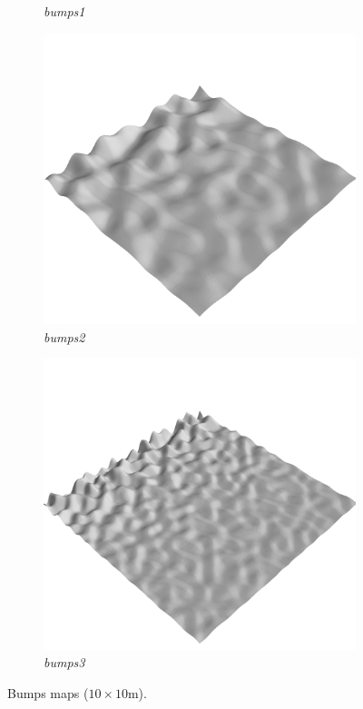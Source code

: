 \documentclass[../document.tex]{subfiles}
\begin{document}
\begin{figure}[H]
\begin{subfigure}[b]{0.32\linewidth}
            \caption{\emph{bumps1}}
            \end{subfigure}    
          \begin{subfigure}[b]{0.32\textwidth}
            \includegraphics[width=\textwidth]{../img/hm3d/bumps2.png}
            \caption{\emph{bumps2}}
        \end{subfigure}    
        \begin{subfigure}[b]{0.32\textwidth}
            \includegraphics[width=\textwidth]{../img/hm3d/bumps3.png}
            \caption{\emph{bumps3}}
        \end{subfigure}    
    \label{fig: heightmaps}
    \caption{Bumps maps ($10\times10$m).}
\end{figure}
\end{document}

